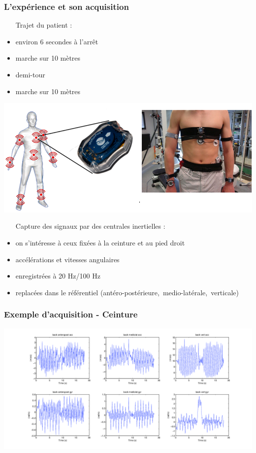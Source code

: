 \documentclass{beamer}
\begin{document}
\begin{frame}
	\frametitle{L'expérience et son acquisition}
    \begin{minipage}{0.59\textwidth}
      	\begin{itemize}
			\item[Trajet] du patient : 
			\item environ 6 secondes à l'arrêt
			\item marche sur 10 mètres
			\item demi-tour
			\item marche sur 10 mètres
		\end{itemize}
    \end{minipage}
    \begin{minipage}{0.39\textwidth}
   		\hspace*{-1.13cm}\includegraphics[scale=.95]{capteurs}
    \end{minipage}
    
	\begin{itemize}
		\item[Capture] des signaux par des centrales inertielles : 
		\item on s'intéresse à ceux fixées à la ceinture et au pied droit
		\item accélérations et vitesses angulaires
		\item enregistrées à 20 Hz/100 Hz
		\item replacées dans le référentiel \mbox{(antéro-postérieure, medio-latérale, verticale)}
	\end{itemize}
\end{frame}

\begin{frame}
	\frametitle{Exemple d'acquisition - Ceinture}

			\hspace*{-2.75cm}\includegraphics[scale=0.40]{examplevisuback}

\end{frame}
\end{document}
